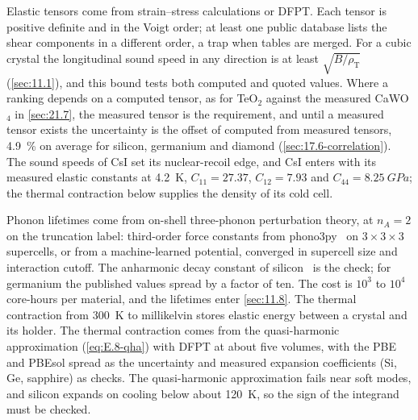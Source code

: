 Elastic tensors come from strain--stress calculations or DFPT. Each tensor is positive definite and in the Voigt order; at least one public database lists the shear components in a different order, a trap when tables are merged. For a cubic crystal the longitudinal sound speed in any direction is at least $\sqrt{B/\rho_{\mathrm{T}}}$ (\cref{sec:11.1}), and this bound tests both computed and quoted values. Where a ranking depends on a computed tensor, as for TeO$_2$ against the measured CaWO$_4$ in \cref{sec:21.7}, the measured tensor is the requirement, and until a measured tensor exists the uncertainty is the offset of computed from measured tensors, \SI{4.9}{\percent} on average for silicon, germanium and diamond (\cref{sec:17.6-correlation}). The sound speeds of CsI set its nuclear-recoil edge, and CsI enters with its measured elastic constants at \SI{4.2}{K}, $C_{11} = 27.37$, $C_{12} = 7.93$ and $C_{44} = \SI{8.25}{GPa}$; the thermal contraction below supplies the density of its cold cell.

Phonon lifetimes come from on-shell three-phonon perturbation theory, at $n_A = 2$ on the truncation label: third-order force constants from phono3py~\cite{togo2015distributions} on $3\times3\times3$ supercells, or from a machine-learned potential, converged in supercell size and interaction cutoff. The anharmonic decay constant of silicon~\cite{tamura1985spontaneous} is the check; for germanium the published values spread by a factor of ten. The cost is $10^3$ to $10^4$ core-hours per material, and the lifetimes enter \cref{sec:11.8}. The thermal contraction from \SI{300}{K} to millikelvin stores elastic energy between a crystal and its holder. The thermal contraction comes from the quasi-harmonic approximation (\cref{eq:E.8-qha}) with DFPT at about five volumes, with the PBE and PBEsol spread as the uncertainty and measured expansion coefficients (Si, Ge, sapphire) as checks. The quasi-harmonic approximation fails near soft modes, and silicon expands on cooling below about \SI{120}{K}, so the sign of the integrand must be checked.
